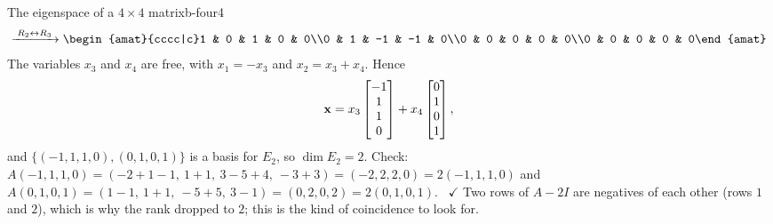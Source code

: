 \documentclass[11pt]{article}
\begin{document}
\begin{exmp}{The eigenspace of a $4\times4$ matrix}{b-four4}
\begin{align*}
\rops{R_2\leftrightarrow R_3}
\begin{amat}{cccc|c}1 & 0 & 1 & 0 & 0\\0 & 1 & -1 & -1 & 0\\0 & 0 & 0 & 0 & 0\\0 & 0 & 0 & 0 & 0\end{amat}
\end{align*}
The variables $x_3$ and $x_4$ are free, with $x_1=-x_3$ and $x_2=x_3+x_4$. Hence
\[
\mathbf{x}=x_3\begin{bmatrix}-1\\1\\1\\0\end{bmatrix}+x_4\begin{bmatrix}0\\1\\0\\1\end{bmatrix},
\]
and $\{(-1,1,1,0),(0,1,0,1)\}$ is a basis for $E_2$, so $\dim E_2=2$. Check: $A(-1,1,1,0)=(-2+1-1,\ 1+1,\ 3-5+4,\ -3+3)=(-2,2,2,0)=2(-1,1,1,0)$ and $A(0,1,0,1)=(1-1,\ 1+1,\ -5+5,\ 3-1)=(0,2,0,2)=2(0,1,0,1)$. \ $\checkmark$ Two rows of $A-2I$ are negatives of each other (rows $1$ and $2$), which is why the rank dropped to $2$; this is the kind of coincidence to look for.
\end{exmp}
\end{document}
